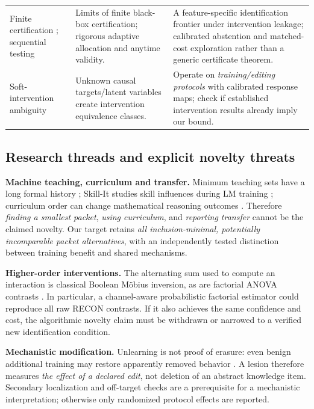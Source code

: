 \documentclass[11pt,a4paper]{article}
\theoremstyle{definition}\newtheorem{definition}[theorem]{Definition}
\theoremstyle{remark}\newtheorem{remark}[theorem]{Remark}
\begin{document}
\begin{table}[htbp]
\begin{tabularx}{\linewidth}{@{}p{.21\linewidth}Y Y@{}}
Finite certification \citep{wu2026}; sequential testing \citep{howard,garivier}&Limits of finite black-box certification; rigorous adaptive allocation and anytime validity.&A feature-specific identification frontier under intervention leakage; calibrated abstention and matched-cost exploration rather than a generic certificate theorem.\\
Soft-intervention ambiguity \citep{jaber,varici}&Unknown causal targets/latent variables create intervention equivalence classes.&Operate on \emph{training/editing protocols} with calibrated response maps; check if established intervention results already imply our bound.\\\bottomrule
\end{tabularx}
\end{table}

\subsection{Research threads and explicit novelty threats}
\textbf{Machine teaching, curriculum and transfer.} Minimum teaching sets have a long formal history \citep{teaching,jaimovitch}; Skill-It studies skill influences during LM training \citep{skillit}; curriculum order can change mathematical reasoning outcomes \citep{curriculum}. Therefore \emph{finding a smallest packet}, \emph{using curriculum}, and \emph{reporting transfer} cannot be the claimed novelty. Our target retains \emph{all inclusion-minimal, potentially incomparable packet alternatives}, with an independently tested distinction between training benefit and shared mechanisms.

\textbf{Higher-order interventions.} The alternating sum used to compute an interaction is classical Boolean M\"obius inversion, as are factorial ANOVA contrasts \citep{shyamal,syntheticcomb}. In particular, a channel-aware probabilistic factorial estimator could reproduce all raw RECON contrasts. If it also achieves the same confidence and cost, the algorithmic novelty claim must be withdrawn or narrowed to a verified new identification condition.

\textbf{Mechanistic modification.} Unlearning is not proof of erasure: even benign additional training may restore apparently removed behavior \citep{hu2025,guo,fan2025}. A lesion therefore measures \emph{the effect of a declared edit}, not deletion of an abstract knowledge item. Secondary localization and off-target checks are a prerequisite for a mechanistic interpretation; otherwise only randomized protocol effects are reported.
\end{document}
